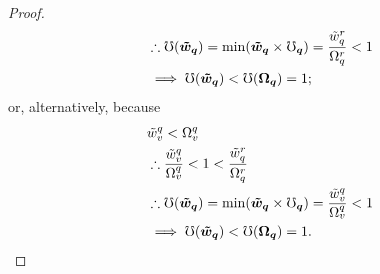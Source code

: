 \documentclass[hidelinks, nonatbib]{elsarticle}
\begin{document}
\begin{lemma}
\begin{proof}
\begin{align}
            &\therefore
            \mho(\boldsymbol{\tilde{w}_q})
            = 
            \min(
                \boldsymbol{\tilde{w}_q}
                \times
                \boldsymbol{\mho_q}
            )
            =
            \frac{
                \tilde{w}_{q}^{r}
            }{
                \Omega_{q}^{r}
            }
            < 
            1
            \\
            &\implies
            \mho(\boldsymbol{\tilde{w}_q})
            <
            \mho(\boldsymbol{\Omega_q})
            =
            1
            ;
        \end{align}
        or, alternatively, because
        \begin{align}
            &
            \tilde{w}_{v}^{q} < \Omega_{v}^{q}
            \\
            &\therefore
            \frac{
                \tilde{w}_{v}^{q}
            }{
                \Omega_{v}^{q}
            }
            < 
            1
            < 
            \frac{
                \tilde{w}_{q}^{r}
            }{
                \Omega_{q}^{r}
            }
            \\
            &\therefore
            \mho(\boldsymbol{\tilde{w}_q})
            = 
            \min(
                \boldsymbol{\tilde{w}_q}
                \times
                \boldsymbol{\mho_q}
            )
            =
            \frac{
                \tilde{w}_{v}^{q}
            }{
                \Omega_{v}^{q}
            }
            < 
            1
            \\
            &\implies
            \mho(\boldsymbol{\tilde{w}_q})
            <
            \mho(\boldsymbol{\Omega_q})
            =
            1
            .
        \end{align}
        

\end{proof}
\end{lemma}
\end{document}

